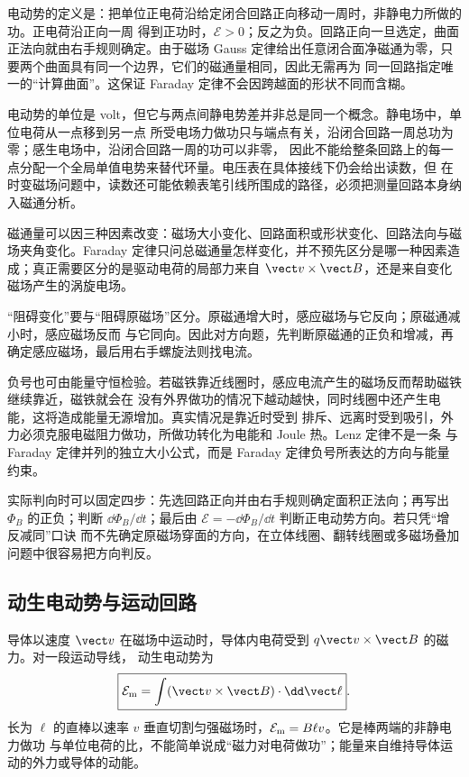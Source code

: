 电动势的定义是：把单位正电荷沿给定闭合回路正向移动一周时，非静电力所做的功。正电荷沿正向一周
得到正功时，$\mathcal E>0$；反之为负。回路正向一旦选定，曲面正法向就由右手规则确定。由于磁场
Gauss 定律给出任意闭合面净磁通为零，只要两个曲面具有同一个边界，它们的磁通量相同，因此无需再为
同一回路指定唯一的“计算曲面”。这保证 Faraday 定律不会因跨越面的形状不同而含糊。

电动势的单位是 volt，但它与两点间静电势差并非总是同一个概念。静电场中，单位电荷从一点移到另一点
所受电场力做功只与端点有关，沿闭合回路一周总功为零；感生电场中，沿闭合回路一周的功可以非零，
因此不能给整条回路上的每一点分配一个全局单值电势来替代环量。电压表在具体接线下仍会给出读数，但
在时变磁场问题中，读数还可能依赖表笔引线所围成的路径，必须把测量回路本身纳入磁通分析。

磁通量可以因三种因素改变：磁场大小变化、回路面积或形状变化、回路法向与磁场夹角变化。Faraday
定律只问总磁通量怎样变化，并不预先区分是哪一种因素造成；真正需要区分的是驱动电荷的局部力来自
$\vect v\times\vect B$，还是来自变化磁场产生的涡旋电场。

\fluxOrientationDiagram

“阻碍变化”要与“阻碍原磁场”区分。原磁通增大时，感应磁场与它反向；原磁通减小时，感应磁场反而
与它同向。因此对方向题，先判断原磁通的正负和增减，再确定感应磁场，最后用右手螺旋法则找电流。

负号也可由能量守恒检验。若磁铁靠近线圈时，感应电流产生的磁场反而帮助磁铁继续靠近，磁铁就会在
没有外界做功的情况下越动越快，同时线圈中还产生电能，这将造成能量无源增加。真实情况是靠近时受到
排斥、远离时受到吸引，外力必须克服电磁阻力做功，所做功转化为电能和 Joule 热。Lenz 定律不是一条
与 Faraday 定律并列的独立大小公式，而是 Faraday 定律负号所表达的方向与能量约束。

实际判向时可以固定四步：先选回路正向并由右手规则确定面积正法向；再写出 $\Phi_B$ 的正负；判断
$\dd\Phi_B/\dd t$；最后由 $\mathcal E=-\dd\Phi_B/\dd t$ 判断正电动势方向。若只凭“增反减同”口诀
而不先确定原磁场穿面的方向，在立体线圈、翻转线圈或多磁场叠加问题中很容易把方向判反。

\subsection*{动生电动势与运动回路}

导体以速度 $\vect v$ 在磁场中运动时，导体内电荷受到 $q\vect v\times\vect B$ 的磁力。对一段运动导线，
动生电动势为
\begin{equation}
  \boxed{\mathcal E_{\rm m}=\int(\vect v\times\vect B)\cdot\dd\vect\ell}.
\end{equation}
长为 $\ell$ 的直棒以速率 $v$ 垂直切割匀强磁场时，$\mathcal E_{\rm m}=B\ell v$。它是棒两端的非静电力做功
与单位电荷的比，不能简单说成“磁力对电荷做功”；能量来自维持导体运动的外力或导体的动能。


